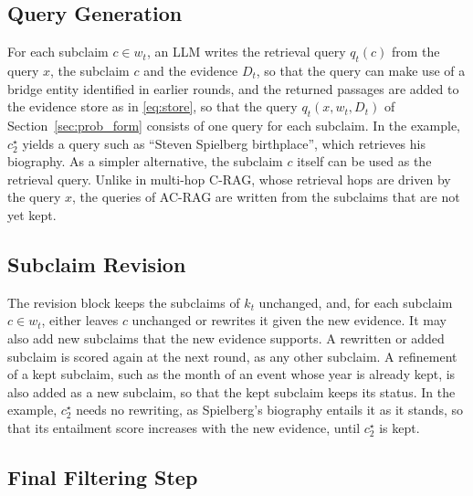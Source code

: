 \subsection{Query Generation}\label{subsec:query}

For each subclaim $c \in w_t$, an LLM writes the retrieval query $q_t(c)$ from the query $x$, the subclaim $c$ and the evidence $D_t$, so that the query can make use of a bridge entity identified in earlier rounds, and the returned passages are added to the evidence store as in \eqref{eq:store}, so that the query $q_t(x, w_t, D_t)$ of Section~\ref{sec:prob_form} consists of one query for each subclaim. In the example, $c^{\star}_2$ yields a query such as ``Steven Spielberg birthplace'', which retrieves his biography. As a simpler alternative, the subclaim $c$ itself can be used as the retrieval query. Unlike in multi-hop C-RAG, whose retrieval hops are driven by the query $x$, the queries of AC-RAG are written from the subclaims that are not yet kept.

\subsection{Subclaim Revision}\label{subsec:revision}

The revision block keeps the subclaims of $k_t$ unchanged, and, for each subclaim $c \in w_t$, either leaves $c$ unchanged or rewrites it given the new evidence. It may also add new subclaims that the new evidence supports. A rewritten or added subclaim is scored again at the next round, as any other subclaim. A refinement of a kept subclaim, such as the month of an event whose year is already kept, is also added as a new subclaim, so that the kept subclaim keeps its status. In the example, $c^{\star}_2$ needs no rewriting, as Spielberg's biography entails it as it stands, so that its entailment score increases with the new evidence, until $c^{\star}_2$ is kept. 

\subsection{Final Filtering Step}\label{subsec:final}

